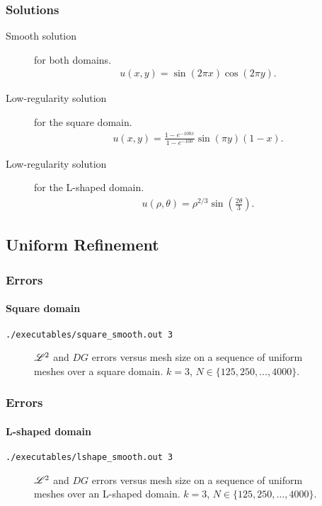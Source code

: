 \begin{frame}
    \frametitle{Solutions}

    \begin{description}
        \item[Smooth solution] for both domains.
            \begin{gather}
                u(x, y) = \sin(2 \pi x) \cos(2 \pi y).
            \end{gather}
        \item[Low-regularity solution] for the square domain. 
            \begin{gather}
                u(x, y) = \frac{1 - e^{-100x}}{1 - e^{-100}} \sin(\pi y) (1 - x).
            \end{gather}
        \item[Low-regularity solution] for the L-shaped domain.
            \begin{gather}
                u(\rho, \theta) = \rho^{2 / 3} \sin\left(\frac{2 \theta}{3}\right).
            \end{gather}
    \end{description}
\end{frame}

\subsection{Uniform Refinement}

\begin{frame}[fragile]
    \frametitle{Errors}
    \framesubtitle{Square domain}

    \lstinline{./executables/square_smooth.out 3}

    \begin{figure}[!ht]
        
        \caption{$\mathscr{L}^2$ and $DG$ errors versus mesh size on a sequence of uniform meshes over a square domain. $k = 3$, $N \in \{125, 250, \dots, 4000\}$.}
    \end{figure}
\end{frame}

\begin{frame}[fragile]
    \frametitle{Errors}
    \framesubtitle{L-shaped domain}

    \lstinline{./executables/lshape_smooth.out 3}

    \begin{figure}[!ht]
        
        \caption{$\mathscr{L}^2$ and $DG$ errors versus mesh size on a sequence of uniform meshes over an L-shaped domain. $k = 3$, $N \in \{125, 250, \dots, 4000\}$.}
    \end{figure}
\end{frame}

